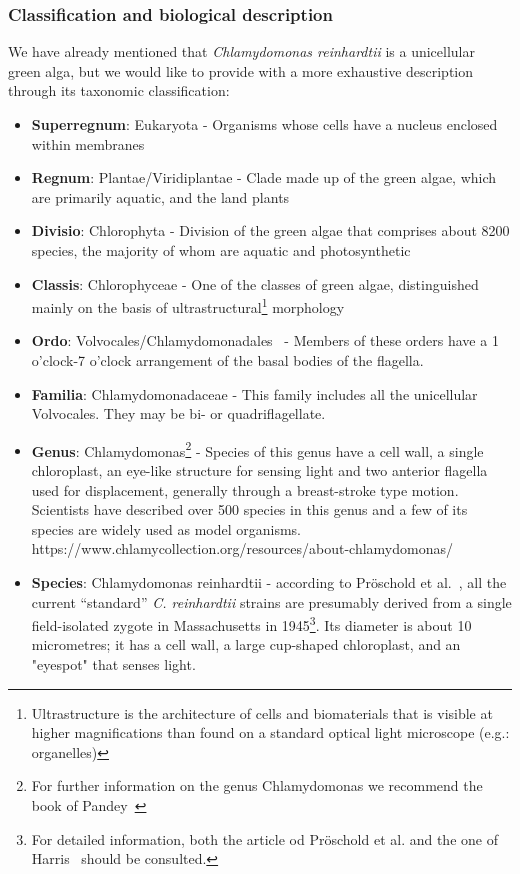\subsubsection{Classification and biological description}
\label{bio_chlamy}

We have already mentioned that \textit{Chlamydomonas reinhardtii}
is a unicellular green alga, but we would like to provide with a more exhaustive description through its taxonomic classification: 

\begin{itemize}
	\item \textbf{Superregnum}: Eukaryota - Organisms whose cells have a nucleus enclosed within membranes	
	\item \textbf{Regnum}: Plantae/Viridiplantae - Clade made up of the green algae, which are primarily aquatic, and the land plants
	\item \textbf{Divisio}: Chlorophyta - Division of the green algae that comprises about 8200 species, the majority of whom are aquatic and photosynthetic
	\item \textbf{Classis}: Chlorophyceae - One of the classes of green algae, distinguished mainly on the basis of ultrastructural\footnote{Ultrastructure is the architecture of cells and biomaterials that is visible at higher magnifications than found on a standard optical light microscope (e.g.: organelles)} morphology
	\item \textbf{Ordo}: Volvocales/Chlamydomonadales~\cite{chlorophyceae} - Members of these orders have a 1 o'clock-7 o'clock arrangement of the basal bodies of the flagella.
	\item \textbf{Familia}: Chlamydomonadaceae - This family includes all the unicellular Volvocales. They may be bi- or quadriflagellate.
	\item \textbf{Genus}: Chlamydomonas\footnote{For further information on the genus Chlamydomonas we recommend the book of Pandey~\cite{Pandey}} - Species of this genus have a cell wall, a single chloroplast, an eye-like structure for sensing light and two anterior flagella used for displacement, generally through a breast-stroke type motion.
	Scientists have described over 500 species in this genus and a few of its species are widely used as model organisms.
	https://www.chlamycollection.org/resources/about-chlamydomonas/
	\item \textbf{Species}: Chlamydomonas reinhardtii - according to Pröschold et al.~\cite{Proschold}, all the current “standard” \textit{C. reinhardtii} strains are presumably derived from a single field-isolated zygote in Massachusetts in 1945\footnote{For detailed information, both the article od Pröschold et al. and the one of Harris~\cite{Harris} should be consulted.}. Its diameter is about 10 micrometres; it has a cell wall, a large cup-shaped chloroplast, and an "eyespot" that senses light. 
\end{itemize}

